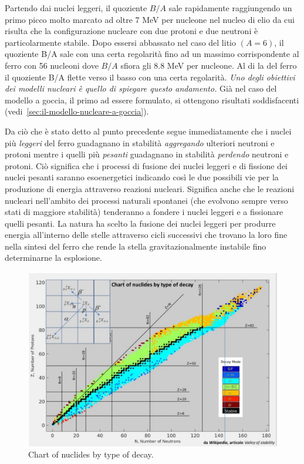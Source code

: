 Partendo dai nuclei leggeri, il quoziente $B/A$ sale rapidamente raggiungendo un primo picco molto marcato ad oltre 7 MeV
per nucleone nel nucleo di elio da cui risulta che la configurazione nucleare con due protoni e due neutroni è
particolarmente stabile.
Dopo essersi abbassato nel caso del litio $(A=6)$, il quoziente B/A sale con una certa regolarità fino ad un massimo
corrispondente al ferro con 56 nucleoni dove $B/A$ sfiora gli $8.8$ MeV per nucleone.
Al di la del ferro il quoziente B/A flette verso il basso con una certa regolarità.
\emph{Uno degli obiettivi dei modelli nucleari è quello di spiegare questo andamento.}
Già nel caso del modello a goccia, il primo ad essere formulato, si ottengono risultati soddisfacenti (vedi~\ref{sec:il-modello-nucleare-a-goccia}).

Da ciò che è stato detto al punto precedente segue immediatamente che i nuclei più \emph{leggeri} del ferro guadagnano in
stabilità \emph{aggregando} ulteriori neutroni e protoni mentre i quelli più \emph{pesanti} guadagnano in stabilità 
\emph{perdendo} neutroni e protoni.
Ciò significa che i processi di fusione dei nuclei leggeri e di fissione dei nuclei pesanti saranno esoenergetici
indicando così le due possibili vie per la produzione di energia attraverso reazioni nucleari.
Significa anche che le reazioni nucleari nell’ambito dei processi naturali spontanei (che evolvono sempre verso stati
di maggiore stabilità) tenderanno a fondere i nuclei leggeri e a fissionare quelli pesanti.
La natura ha scelto la fusione dei nuclei leggeri per produrre energia all’interno delle stelle attraverso cicli
successivi che trovano la loro fine nella sintesi del ferro che rende la stella gravitazionalmente instabile fino
determinarne la esplosione.

\begin{figure}
    \centering
    \includegraphics{../figs/nuclides-chart-decay}
    \caption{Chart of nuclides by type of decay.}
    \label{fig:nuclides-chart-decay}
\end{figure}

